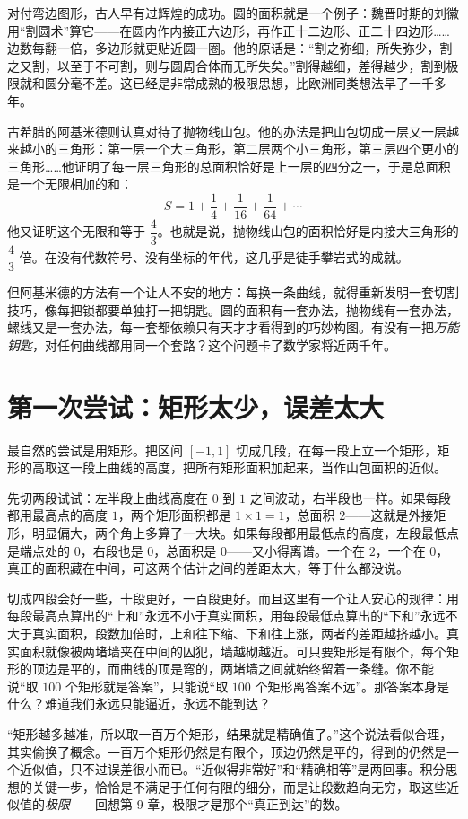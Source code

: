 对付弯边图形，古人早有过辉煌的成功。圆的面积就是一个例子：魏晋时期的刘徽用“割圆术”算它——在圆内作内接正六边形，再作正十二边形、正二十四边形……边数每翻一倍，多边形就更贴近圆一圈。他的原话是：“割之弥细，所失弥少，割之又割，以至于不可割，则与圆周合体而无所失矣。”割得越细，差得越少，割到极限就和圆分毫不差。这已经是非常成熟的极限思想，比欧洲同类想法早了一千多年。

古希腊的阿基米德则认真对待了抛物线山包。他的办法是把山包切成一层又一层越来越小的三角形：第一层一个大三角形，第二层两个小三角形，第三层四个更小的三角形……他证明了每一层三角形的总面积恰好是上一层的四分之一，于是总面积是一个无限相加的和：
\[
S=1+\frac14+\frac1{16}+\frac1{64}+\cdots
\]
他又证明这个无限和等于 $\dfrac43$。也就是说，抛物线山包的面积恰好是内接大三角形的 $\dfrac43$ 倍。在没有代数符号、没有坐标的年代，这几乎是徒手攀岩式的成就。

但阿基米德的方法有一个让人不安的地方：每换一条曲线，就得重新发明一套切割技巧，像每把锁都要单独打一把钥匙。圆的面积有一套办法，抛物线有一套办法，螺线又是一套办法，每一套都依赖只有天才才看得到的巧妙构图。有没有一把\emph{万能钥匙}，对任何曲线都用同一个套路？这个问题卡了数学家将近两千年。

\section{第一次尝试：矩形太少，误差太大}

最自然的尝试是用矩形。把区间 $[-1,1]$ 切成几段，在每一段上立一个矩形，矩形的高取这一段上曲线的高度，把所有矩形面积加起来，当作山包面积的近似。

先切两段试试：左半段上曲线高度在 $0$ 到 $1$ 之间波动，右半段也一样。如果每段都用最高点的高度 $1$，两个矩形面积都是 $1\times 1=1$，总面积 $2$——这就是外接矩形，明显偏大，两个角上多算了一大块。如果每段都用最低点的高度，左段最低点是端点处的 $0$，右段也是 $0$，总面积是 $0$——又小得离谱。一个在 $2$，一个在 $0$，真正的面积藏在中间，可这两个估计之间的差距太大，等于什么都没说。

切成四段会好一些，十段更好，一百段更好。而且这里有一个让人安心的规律：用每段最高点算出的“上和”永远不小于真实面积，用每段最低点算出的“下和”永远不大于真实面积，段数加倍时，上和往下缩、下和往上涨，两者的差距越挤越小。真实面积就像被两堵墙夹在中间的囚犯，墙越砌越近。可只要矩形是有限个，每个矩形的顶边是平的，而曲线的顶是弯的，两堵墙之间就始终留着一条缝。你不能说“取 $100$ 个矩形就是答案”，只能说“取 $100$ 个矩形离答案不远”。那答案本身是什么？难道我们永远只能逼近，永远不能到达？

\begin{fanli}
“矩形越多越准，所以取一百万个矩形，结果就是精确值了。”这个说法看似合理，其实偷换了概念。一百万个矩形仍然是有限个，顶边仍然是平的，得到的仍然是一个近似值，只不过误差很小而已。“近似得非常好”和“精确相等”是两回事。积分思想的关键一步，恰恰是不满足于任何有限的细分，而是让段数趋向无穷，取这些近似值的\emph{极限}——回想第 9 章，极限才是那个“真正到达”的数。
\end{fanli}

